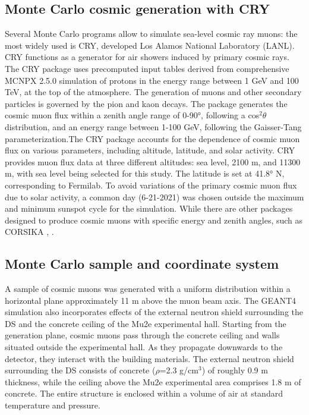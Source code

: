 \subsection{Monte Carlo cosmic generation with CRY}
Several Monte Carlo programs allow to simulate sea-level 
cosmic ray muons: the most widely used is CRY, developed 
 Los Alamos National Laboratory (LANL). CRY \cite{Hagmann2007CosmicraySG} functions as a generator for air showers 
induced by primary cosmic rays. The CRY package uses 
precomputed input tables derived from comprehensive 
MCNPX 2.5.0 simulation of protons in the energy range 
between 1 GeV and 100 TeV, at the top of the atmosphere.
The generation of muons and other secondary particles 
is governed by the pion and kaon decays. The package 
generates the cosmic muon flux within a zenith angle range 
of 0-90°, following a cos$^2 \theta$ distribution, and an 
energy range between 1-100 GeV, following the Gaisser-Tang
parameterization.The CRY package accounts for the 
dependence of cosmic muon flux on various parameters, 
including altitude, latitude, and solar activity. CRY 
provides muon flux data at three different altitudes: 
sea level, 2100 m, and 11300 m, with sea level being 
selected for this study. The latitude is set at 41.8° N, 
corresponding to Fermilab. To avoid variations of the 
primary cosmic muon flux due to solar activity, a 
common day (6-21-2021) was chosen outside the maximum and minimum 
sunspot cycle for the simulation. While there are other 
packages designed to produce cosmic muons with specific 
energy and zenith angles, such as CORSIKA \cite{Heck:1998vt},
.

\subsection{Monte Carlo sample and coordinate system }\label{genplane}
A sample of cosmic muons was generated with a uniform distribution within a
horizontal plane approximately 11 m above the muon beam axis. The GEANT4 
simulation also incorporates  effects of the external neutron shield surrounding the DS 
and the concrete ceiling of the Mu2e experimental hall. Starting from the generation plane, 
cosmic muons pass through the concrete ceiling and walls situated outside the experimental hall. 
As they propagate downwards to the detector, they interact with the building materials. 
The external neutron shield surrounding the DS consists of concrete ($\rho$=2.3 g/cm$^3$) of  
roughly 0.9 m thickness, while the ceiling above the Mu2e experimental area comprises 1.8 m of concrete. 
The entire structure is enclosed within a volume of air at standard temperature and pressure.

